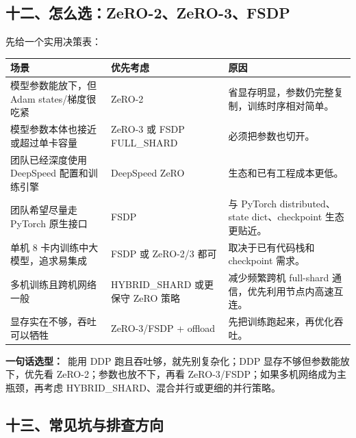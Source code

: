 \subsection{十二、怎么选：ZeRO-2、ZeRO-3、FSDP}

先给一个实用决策表：

\begin{center}
{\small
\begin{tabular}{p{4.3cm}p{3.1cm}p{5.1cm}}
\hline
\textbf{场景} & \textbf{优先考虑} & \textbf{原因} \\
\hline
模型参数能放下，但 Adam states/梯度很吃紧 & ZeRO-2 & 省显存明显，参数仍完整复制，训练时序相对简单。 \\
模型参数本体也接近或超过单卡容量 & ZeRO-3 或 FSDP FULL\_SHARD & 必须把参数也切开。 \\
团队已经深度使用 DeepSpeed 配置和训练引擎 & DeepSpeed ZeRO & 生态和已有工程成本更低。 \\
团队希望尽量走 PyTorch 原生接口 & FSDP & 与 PyTorch distributed、state dict、checkpoint 生态更贴近。 \\
单机 8 卡内训练中大模型，追求易集成 & FSDP 或 ZeRO-2/3 都可 & 取决于已有代码栈和 checkpoint 需求。 \\
多机训练且跨机网络一般 & HYBRID\_SHARD 或更保守 ZeRO 策略 & 减少频繁跨机 full-shard 通信，优先利用节点内高速互连。 \\
显存实在不够，吞吐可以牺牲 & ZeRO-3/FSDP + offload & 先把训练跑起来，再优化吞吐。 \\
\hline
\end{tabular}
}
\end{center}

\begin{summarybox}
\textbf{一句话选型：}\
能用 DDP 跑且吞吐够，就先别复杂化；DDP 显存不够但参数能放下，优先看 ZeRO-2；参数也放不下，再看 ZeRO-3/FSDP；如果多机网络成为主瓶颈，再考虑 HYBRID\_SHARD、混合并行或更细的并行策略。
\end{summarybox}

\subsection{十三、常见坑与排查方向}

